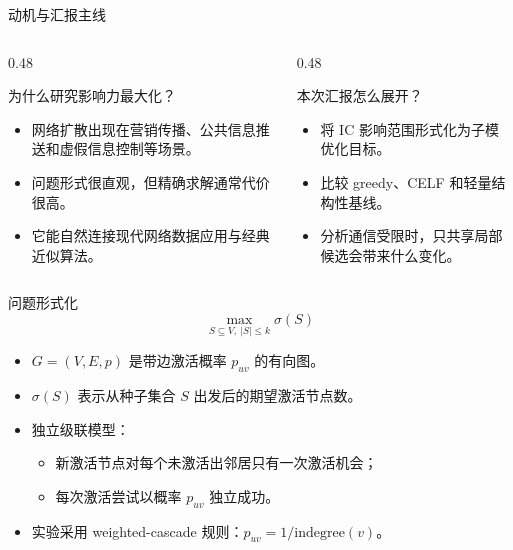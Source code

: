 \documentclass[UTF8, 10pt, aspectratio=169]{ctexbeamer}
\begin{document}
\begin{frame}{动机与汇报主线}
    \begin{columns}[T,onlytextwidth]
        \begin{column}{0.48\linewidth}
            \begin{block}{为什么研究影响力最大化？}
                \begin{itemize}
                    \item 网络扩散出现在营销传播、公共信息推送和虚假信息控制等场景。
                    \item 问题形式很直观，但精确求解通常代价很高。
                    \item 它能自然连接现代网络数据应用与经典近似算法。
                \end{itemize}
            \end{block}
        \end{column}
        \begin{column}{0.48\linewidth}
            \begin{block}{本次汇报怎么展开？}
                \begin{itemize}
                    \item 将 IC 影响范围形式化为子模优化目标。
                    \item 比较 greedy、CELF 和轻量结构性基线。
                    \item 分析通信受限时，只共享局部候选会带来什么变化。
                \end{itemize}
            \end{block}
        \end{column}
    \end{columns}
\end{frame}

\begin{frame}{问题形式化}
    \[
        \max_{S\subseteq V,\ |S|\leq k} \sigma(S)
    \]
    \begin{itemize}
        \item $G=(V,E,p)$ 是带边激活概率 $p_{uv}$ 的有向图。
        \item $\sigma(S)$ 表示从种子集合 $S$ 出发后的期望激活节点数。
        \item 独立级联模型：
        \begin{itemize}
            \item 新激活节点对每个未激活出邻居只有一次激活机会；
            \item 每次激活尝试以概率 $p_{uv}$ 独立成功。
        \end{itemize}
        \item 实验采用 weighted-cascade 规则：$p_{uv}=1/\mathrm{indegree}(v)$。
    \end{itemize}
\end{frame}
\end{document}
